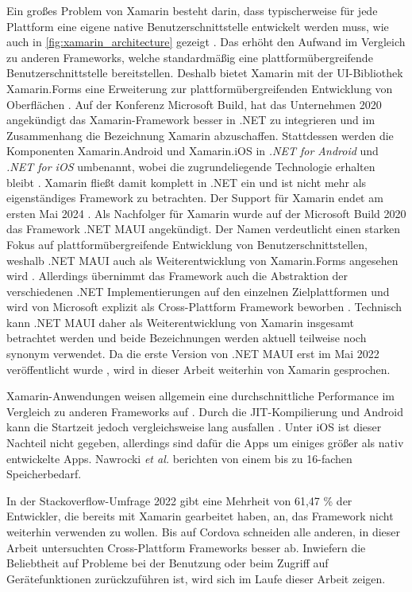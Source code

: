 Ein großes Problem von Xamarin besteht darin, dass typischerweise für jede Plattform eine eigene native Benutzerschnittstelle entwickelt werden muss, wie auch in \autoref{fig:xamarin_architecture} gezeigt \cite{Xamarin_Homepage}.
Das erhöht den Aufwand im Vergleich zu anderen Frameworks, welche standardmäßig eine plattformübergreifende Benutzerschnittstelle bereitstellen.
Deshalb bietet Xamarin mit der \ac{UI}-Bibliothek Xamarin.Forms eine Erweiterung zur plattformübergreifenden Entwicklung von Oberflächen \cite{Xamarin_Homepage}.
Auf der Konferenz Microsoft Build, hat das Unternehmen 2020 angekündigt das Xamarin-Framework besser in .NET zu integrieren und im Zusammenhang die Bezeichnung Xamarin abzuschaffen.
Stattdessen werden die Komponenten Xamarin.Android und Xamarin.iOS in \textit{.NET for Android} und \textit{.NET for iOS} umbenannt, wobei die zugrundeliegende Technologie erhalten bleibt \cite{MS_Build_2020}.
Xamarin fließt damit komplett in .NET ein und ist nicht mehr als eigenständiges Framework zu betrachten.
Der Support für Xamarin endet am ersten Mai 2024 \cite{Xamarin_EOL}.
Als Nachfolger für Xamarin wurde auf der Microsoft Build 2020 das Framework .NET \ac{MAUI} angekündigt.
Der Namen verdeutlicht einen starken Fokus auf plattformübergreifende Entwicklung von Benutzerschnittstellen, weshalb .NET \ac{MAUI} auch als Weiterentwicklung von Xamarin.Forms angesehen wird \cite{NET_MAUI_Introduction}.
Allerdings übernimmt das Framework auch die Abstraktion der verschiedenen .NET Implementierungen auf den einzelnen Zielplattformen und wird von Microsoft explizit als Cross-Plattform Framework beworben \cite{NET_MAUI}.
Technisch kann .NET \ac{MAUI} daher als Weiterentwicklung von Xamarin insgesamt betrachtet werden und beide Bezeichnungen werden aktuell teilweise noch synonym verwendet.
Da die erste Version von .NET \ac{MAUI} erst im Mai 2022 veröffentlicht wurde \cite{NET_MAUI_Release}, wird in dieser Arbeit weiterhin von Xamarin gesprochen.


Xamarin-Anwendungen weisen allgemein eine durchschnittliche Performance im Vergleich zu anderen Frameworks auf \cite{Nawrocki_Comparison_Hybrid_Native_Frameworks, Bakker_Xamarin_XamarinForms_Native, Xamarin_Homepage}.
Durch die \ac{JIT}-Kompilierung und Android kann die Startzeit jedoch vergleichsweise lang ausfallen \cite{Nawrocki_Comparison_Hybrid_Native_Frameworks}.
Unter iOS ist dieser Nachteil nicht gegeben, allerdings sind dafür die Apps um einiges größer als nativ entwickelte Apps.
Nawrocki \textit{et al.} \cite{Nawrocki_Comparison_Hybrid_Native_Frameworks} berichten von einem bis zu 16-fachen Speicherbedarf.

In der Stackoverflow-Umfrage 2022 \cite{Stackoverflow_2022} gibt eine Mehrheit von 61,47 \% der Entwickler, die bereits mit Xamarin gearbeitet haben, an, das Framework nicht weiterhin verwenden zu wollen.
Bis auf Cordova schneiden alle anderen, in dieser Arbeit untersuchten Cross-Plattform Frameworks besser ab.
Inwiefern die Beliebtheit auf Probleme bei der Benutzung oder beim Zugriff auf Gerätefunktionen zurückzuführen ist, wird sich im Laufe dieser Arbeit zeigen.
